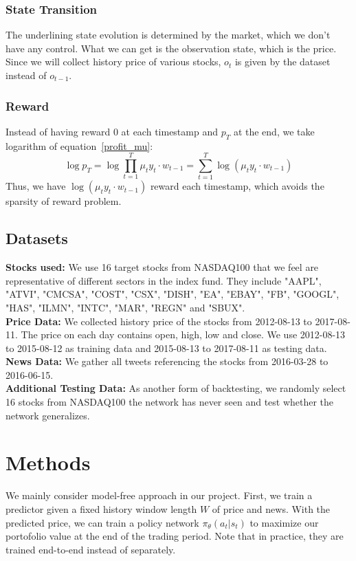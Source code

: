\documentclass[a4paper, 10pt]{article}
\begin{document}
\begin{spacing}{1.2}
    \subsubsection{State Transition}
    The underlining state evolution is determined by the market, which we don't have any control. What we can get is the observation state, which is the price. Since we will collect history price of various stocks, $o_t$ is given by the dataset instead of $o_{t-1}$.\\
    \subsubsection{Reward}
    Instead of having reward 0 at each timestamp and $p_T$ at the end, we take logarithm of equation~\ref{profit_mu}:
    \begin{equation}
    \log{p_T}=\log{\prod_{t=1}^{T}\mu_t y_t\cdot w_{t-1}}=\sum_{t=1}^{T}\log(\mu_t y_t\cdot w_{t-1})
    \end{equation}
    Thus, we have $\log(\mu_t y_t\cdot w_{t-1})$ reward each timestamp, which avoids the sparsity of reward problem.\\
    
    \subsection{Datasets}
    \textbf{Stocks used:}
    We use 16 target stocks from NASDAQ100 that we feel are representative of different sectors in the index fund. They include "AAPL", "ATVI", "CMCSA", "COST", "CSX", "DISH", "EA", "EBAY", "FB", "GOOGL", "HAS", "ILMN", "INTC", "MAR", "REGN" and "SBUX".\\
    \textbf{Price Data:}
    We collected history price of the stocks from 2012-08-13 to 2017-08-11. The price on each day contains open, high, low and close. We use 2012-08-13 to 2015-08-12 as training data and 2015-08-13 to 2017-08-11 as testing data.\\
    \textbf{News Data:}
    We gather all tweets referencing the stocks from 2016-03-28 to 2016-06-15.\\
    \textbf{Additional Testing Data:}
    As another form of backtesting, we randomly select 16 stocks from NASDAQ100 the network has never seen and test whether the network generalizes.
    
    \section{Methods}
    We mainly consider model-free approach in our project. First, we train a predictor given a fixed history window length $W$ of price and news. With the predicted price, we can train a policy network $\pi_{\theta}(a_t|s_t)$ to maximize our portofolio value at the end of the trading period. Note that in practice, they are trained end-to-end instead of separately.
    

\end{spacing}
\end{document}
